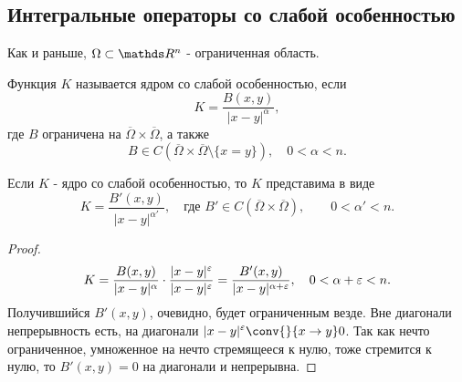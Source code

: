 \subsection{Интегральные операторы со слабой особенностью}
Как и раньше, $\Omega \subset \real^n$ - ограниченная область.

\begin{definition} Функция $K$ называется ядром со слабой особенностью, если
$$ K = \frac {B(x,y)} {|x-y|^\alpha},$$
где $B$ ограничена на $\overline{\Omega} \times \overline{\Omega}$, а также
$$B \in C(\overline{\Omega} \times \overline{\Omega} \setminus \{ x = y \}), \quad 0 < \alpha < n.$$
\end{definition}

\begin{note} Если $K$ - ядро со слабой особенностью, то $K$ представима в виде
$$ K = \frac {B'(x,y)} {|x-y|^{\alpha'}}, \quad \text{где } B' \in C(\overline{\Omega} \times \overline{\Omega}), \quad \quad 0 < \alpha' < n.$$
\end{note}
\begin{proof}
$$ K = \frac {B(x,y)} {|x-y|^\alpha} \cdot \frac {|x-y|^\varepsilon} {|x-y|^\varepsilon} = \frac {B'(x,y)} {|x-y|^{\alpha + \varepsilon}}, \quad 0 < \alpha + \varepsilon < n.$$
Получившийся $B'(x,y)$, очевидно, будет ограниченным везде. Вне диагонали непрерывность есть, на диагонали $\displaystyle |x-y|^\eps \conv{}{x \to y} 0$. Так как нечто ограниченное, умноженное на нечто стремящееся к нулю, тоже стремится к нулю, то $B'(x,y) = 0$ на диагонали и непрерывна.

\end{proof}

